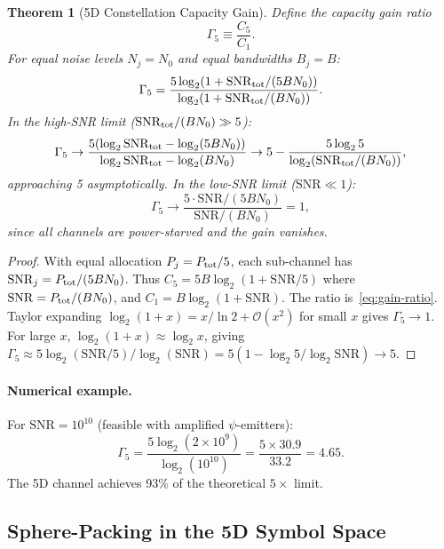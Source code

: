 \documentclass[twocolumn,superscriptaddress,prd,nofootinbib]{revtex4-2}
\newcommand{\order}[1]{\mathcal{O}(#1)}
\newcommand{\SNR}{\mathrm{SNR}}
\newtheorem{theorem}{Theorem}
\begin{document}
\begin{theorem}[5D Constellation Capacity Gain]\label{thm:gain}
Define the capacity gain ratio
\begin{equation}
\Gamma_5 \equiv \frac{C_5}{C_1}.
\end{equation}
For equal noise levels $N_j = N_0$ and equal bandwidths $B_j = B$:
\begin{equation}
\Gamma_5 = \frac{5\log_2(1 + \SNR_{\rm tot}/(5B N_0))}
{\log_2(1 + \SNR_{\rm tot}/(B N_0))}.
\label{eq:gain-ratio}
\end{equation}
In the high-SNR limit ($\SNR_{\rm tot}/(BN_0) \gg 5$):
\begin{equation}
\Gamma_5 \to \frac{5(\log_2 \SNR_{\rm tot} - \log_2(5BN_0))}
{\log_2 \SNR_{\rm tot} - \log_2(BN_0)}
\to 5 - \frac{5\log_2 5}{\log_2(\SNR_{\rm tot}/(BN_0))},
\label{eq:gain-highSNR}
\end{equation}
approaching 5 asymptotically. In the low-SNR limit ($\SNR \ll 1$):
\begin{equation}
\Gamma_5 \to \frac{5\cdot\SNR/(5BN_0)}{\ \SNR/(BN_0)\ } = 1,
\end{equation}
since all channels are power-starved and the gain vanishes.
\end{theorem}

\begin{proof}
With equal allocation $P_j = P_{\rm tot}/5$, each sub-channel has
$\SNR_j = P_{\rm tot}/(5BN_0)$. Thus
$C_5 = 5B\log_2(1 + \SNR/5)$ where $\SNR = P_{\rm tot}/(BN_0)$, and
$C_1 = B\log_2(1 + \SNR)$. The ratio is~\eqref{eq:gain-ratio}.
Taylor expanding $\log_2(1+x) = x/\ln 2 + \order{x^2}$ for small $x$
gives $\Gamma_5 \to 1$. For large $x$,
$\log_2(1+x) \approx \log_2 x$, giving
$\Gamma_5 \approx 5\log_2(\SNR/5)/\log_2(\SNR)
= 5(1 - \log_2 5/\log_2\SNR) \to 5$.
\end{proof}

\paragraph{Numerical example.}
For $\SNR = 10^{10}$ (feasible with amplified $\psi$-emitters):
\begin{equation}
\Gamma_5 = \frac{5\log_2(2\times 10^9)}{\log_2(10^{10})}
= \frac{5\times 30.9}{33.2} = 4.65.
\end{equation}
The 5D channel achieves 93\% of the theoretical $5\times$ limit.

\subsection{Sphere-Packing in the 5D Symbol Space}
\end{document}

